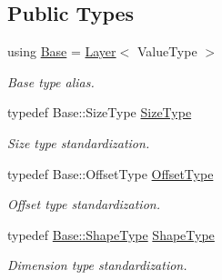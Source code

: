 \subsection*{Public Types}
\begin{DoxyCompactItemize}
\item 
using \hyperlink{classffnn_1_1layer_1_1_input_a7d3eef885863ffbab29a2dba5b9d6e2a}{Base} = \hyperlink{classffnn_1_1layer_1_1_layer}{Layer}$<$ Value\-Type $>$
\begin{DoxyCompactList}\small\item\em Base type alias. \end{DoxyCompactList}\item 
typedef Base\-::\-Size\-Type \hyperlink{classffnn_1_1layer_1_1_input_a0d5acc89e0b0ad61f148c18325fb46f4}{Size\-Type}
\begin{DoxyCompactList}\small\item\em Size type standardization. \end{DoxyCompactList}\item 
typedef Base\-::\-Offset\-Type \hyperlink{classffnn_1_1layer_1_1_input_af8249b647f4c1d4404ae98741b1686e1}{Offset\-Type}
\begin{DoxyCompactList}\small\item\em Offset type standardization. \end{DoxyCompactList}\item 
typedef \hyperlink{classffnn_1_1layer_1_1_layer_ae2f2d0063ab4b2c2a3a6ebf81f4ec32f}{Base\-::\-Shape\-Type} \hyperlink{classffnn_1_1layer_1_1_input_a98068063d95f6c495f2b6ffe5d2890a7}{Shape\-Type}
\begin{DoxyCompactList}\small\item\em Dimension type standardization. \end{DoxyCompactList}\end{DoxyCompactItemize}

